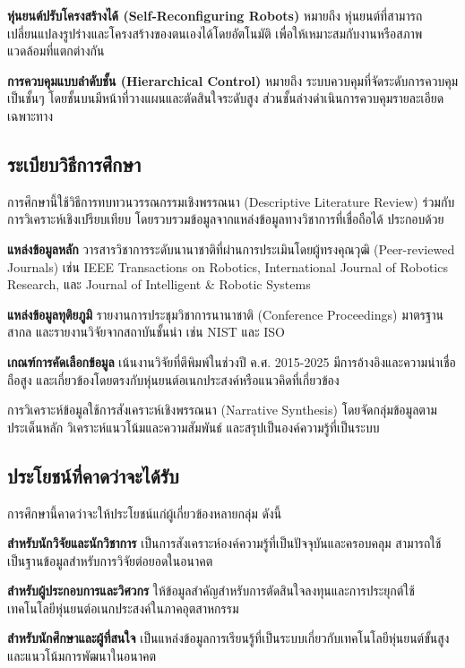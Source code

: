 \documentclass[a4paper]{article}
\begin{document}
\textbf{หุ่นยนต์ปรับโครงสร้างได้ (Self-Reconfiguring Robots)} หมายถึง หุ่นยนต์ที่สามารถเปลี่ยนแปลงรูปร่างและโครงสร้างของตนเองได้โดยอัตโนมัติ เพื่อให้เหมาะสมกับงานหรือสภาพแวดล้อมที่แตกต่างกัน \parencite{hameed2017modular}

\textbf{การควบคุมแบบลำดับชั้น (Hierarchical Control)} หมายถึง ระบบควบคุมที่จัดระดับการควบคุมเป็นชั้นๆ โดยชั้นบนมีหน้าที่วางแผนและตัดสินใจระดับสูง ส่วนชั้นล่างดำเนินการควบคุมรายละเอียดเฉพาะทาง

\subsection{ระเบียบวิธีการศึกษา}

การศึกษานี้ใช้วิธีการทบทวนวรรณกรรมเชิงพรรณนา (Descriptive Literature Review) ร่วมกับการวิเคราะห์เชิงเปรียบเทียบ โดยรวบรวมข้อมูลจากแหล่งข้อมูลทางวิชาการที่เชื่อถือได้ ประกอบด้วย

\textbf{แหล่งข้อมูลหลัก} วารสารวิชาการระดับนานาชาติที่ผ่านการประเมินโดยผู้ทรงคุณวุฒิ (Peer-reviewed Journals) เช่น IEEE Transactions on Robotics, International Journal of Robotics Research, และ Journal of Intelligent \& Robotic Systems

\textbf{แหล่งข้อมูลทุติยภูมิ} รายงานการประชุมวิชาการนานาชาติ (Conference Proceedings) มาตรฐานสากล และรายงานวิจัยจากสถาบันชั้นนำ เช่น NIST และ ISO

\textbf{เกณฑ์การคัดเลือกข้อมูล} เน้นงานวิจัยที่ตีพิมพ์ในช่วงปี ค.ศ. 2015-2025 มีการอ้างอิงและความน่าเชื่อถือสูง และเกี่ยวข้องโดยตรงกับหุ่นยนต์อเนกประสงค์หรือแนวคิดที่เกี่ยวข้อง

การวิเคราะห์ข้อมูลใช้การสังเคราะห์เชิงพรรณนา (Narrative Synthesis) โดยจัดกลุ่มข้อมูลตามประเด็นหลัก วิเคราะห์แนวโน้มและความสัมพันธ์ และสรุปเป็นองค์ความรู้ที่เป็นระบบ

\subsection{ประโยชน์ที่คาดว่าจะได้รับ}

การศึกษานี้คาดว่าจะให้ประโยชน์แก่ผู้เกี่ยวข้องหลายกลุ่ม ดังนี้

\textbf{สำหรับนักวิจัยและนักวิชาการ} เป็นการสังเคราะห์องค์ความรู้ที่เป็นปัจจุบันและครอบคลุม สามารถใช้เป็นฐานข้อมูลสำหรับการวิจัยต่อยอดในอนาคต

\textbf{สำหรับผู้ประกอบการและวิศวกร} ให้ข้อมูลสำคัญสำหรับการตัดสินใจลงทุนและการประยุกต์ใช้เทคโนโลยีหุ่นยนต์อเนกประสงค์ในภาคอุตสาหกรรม

\textbf{สำหรับนักศึกษาและผู้ที่สนใจ} เป็นแหล่งข้อมูลการเรียนรู้ที่เป็นระบบเกี่ยวกับเทคโนโลยีหุ่นยนต์ขั้นสูงและแนวโน้มการพัฒนาในอนาคต
\end{document}
